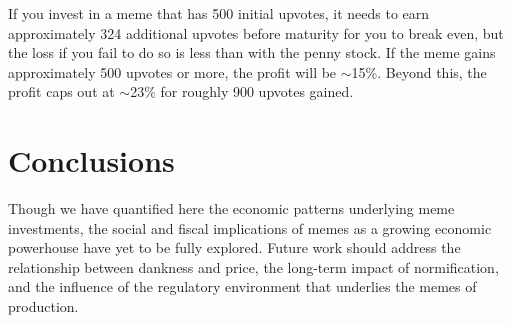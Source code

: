 \documentclass[a4paper, 12pt]{article}
\begin{document}
If you invest in a meme that has 500 initial upvotes, it needs to earn approximately 324
additional upvotes before maturity for you to break even, but the loss if you
fail to do so is less than with the penny stock. If the meme gains approximately
500 upvotes or more, the profit will be \(\sim\)15\%. Beyond this, the profit caps out at \(\sim\)23\%
for roughly 900 upvotes gained.

\section*{Conclusions}
\label{sec:orge5d45eb}

Though we have quantified here the economic patterns underlying meme investments, the
social and fiscal implications of memes as a growing economic powerhouse have
yet to be fully explored. Future work should address the relationship between
dankness and price, the long-term impact of normification, and the influence of
the regulatory environment that underlies the memes of production.



\end{document}
